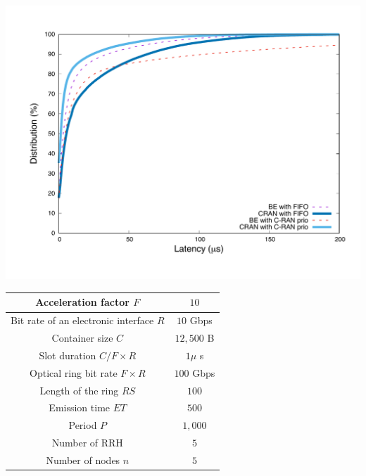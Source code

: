 \documentclass[]{algotel}
\begin{document}
    \begin{minipage}[b]{0.50\linewidth}


        \begin{center}
      \includegraphics[scale=0.3]{opport.pdf}

          \label{fig:resultopport}
      \end{center} 
  \end{minipage}
\hfill
  \begin{minipage}[b]{0.40\linewidth}
  \vspace{-2cm}
  \scalebox{0.7}
  {
  \centering
  \begin{tabular}{|c|c|}
  \hline
 Acceleration factor $F$ & $10$  \tabularnewline
  \hline
  Bit rate of an electronic interface $R$ & $10$ Gbps \tabularnewline
  \hline
  Container size  $C$ & $12,500$ B  \tabularnewline
  \hline
  Slot duration $C/F\times R$ & $1\mu$ s \tabularnewline
  \hline
  Optical ring bit rate $F\times R$ & $100$ Gbps \tabularnewline
  \hline
  Length of the ring $RS$ & $100$ \tabularnewline
  \hline
  Emission time $ET$ & $500$ \tabularnewline
  \hline
   Period $P$ & $1,000$ \tabularnewline
  \hline
  Number of RRH & $5$  \tabularnewline
  \hline
  Number of nodes $n$ & $5$  \tabularnewline
  \hline
  \end{tabular}
  }
  \vspace{1cm}
  \label{fig:params}

  \end{minipage} 
  
\end{document}
